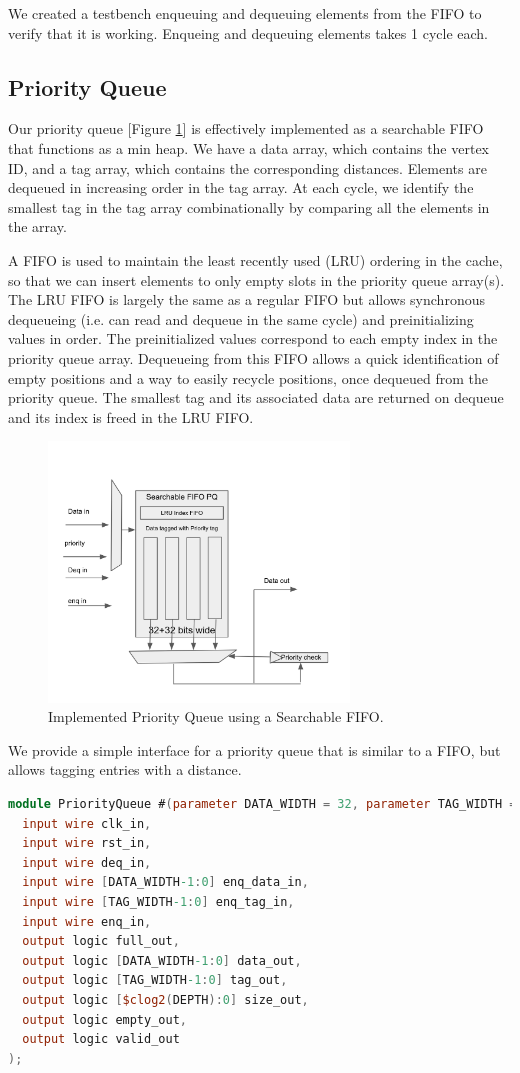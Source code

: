 \documentclass[conference]{IEEEtran}
\begin{document}
We created a testbench enqueuing and dequeuing elements from the FIFO to verify that it is working. Enqueing and dequeuing elements takes 1 cycle each.

\subsection{Priority Queue}

Our priority queue [Figure \ref{pqfig}] is effectively implemented as a searchable FIFO that functions as a min heap. We have a data array, which contains the vertex ID, and a tag array, which contains the corresponding distances. Elements are dequeued in increasing order in the tag array. At each cycle, we identify the smallest tag in the tag array combinationally by comparing all the elements in the array.

A FIFO is used to maintain the least recently used (LRU) ordering in the cache, so that we can insert elements to only empty slots in the priority queue array(s). The LRU FIFO is largely the same as a regular FIFO but allows synchronous dequeueing (i.e. can read and dequeue in the same cycle) and preinitializing values in order. The preinitialized values correspond to each empty index in the priority queue array. Dequeueing from this FIFO allows a quick identification of empty positions and a way to easily recycle positions, once dequeued from the priority queue. The smallest tag and its associated data are returned on dequeue and its index is freed in the LRU FIFO.

\begin{figure}[htbp]
\centerline{\includegraphics[width=8cm]{pq.png}}
\caption{Implemented Priority Queue using a Searchable FIFO.}
\label{pqfig}
\end{figure}


We provide a simple interface for a priority queue that is similar to a FIFO, but allows tagging entries with a distance.
\begin{lstlisting}[language=Verilog]
module PriorityQueue #(parameter DATA_WIDTH = 32, parameter TAG_WIDTH = 32, parameter DEPTH = 8)(
  input wire clk_in,
  input wire rst_in,
  input wire deq_in,
  input wire [DATA_WIDTH-1:0] enq_data_in,
  input wire [TAG_WIDTH-1:0] enq_tag_in,
  input wire enq_in,
  output logic full_out,
  output logic [DATA_WIDTH-1:0] data_out,
  output logic [TAG_WIDTH-1:0] tag_out,
  output logic [$clog2(DEPTH):0] size_out,
  output logic empty_out,
  output logic valid_out
);
\end{lstlisting}
\end{document}
